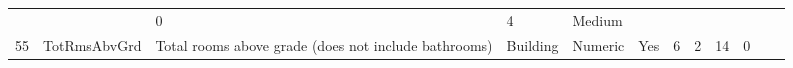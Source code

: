 \documentclass[11pt]{article}
\begin{document}
\begin{longtable}[]{@{}llllllllllll@{}}
\begin{minipage}[t]{0.04\columnwidth}
\strut
\end{minipage} & \begin{minipage}[t]{0.04\columnwidth}\raggedright\strut
\strut
\end{minipage} & \begin{minipage}[t]{0.04\columnwidth}\raggedright\strut
0\strut
\end{minipage} & \begin{minipage}[t]{0.04\columnwidth}\raggedright\strut
4\strut
\end{minipage} & \begin{minipage}[t]{0.04\columnwidth}\raggedright\strut
Medium\strut
\end{minipage}\tabularnewline
\begin{minipage}[t]{0.04\columnwidth}\raggedright\strut
55\strut
\end{minipage} & \begin{minipage}[t]{0.04\columnwidth}\raggedright\strut
TotRmsAbvGrd\strut
\end{minipage} & \begin{minipage}[t]{0.04\columnwidth}\raggedright\strut
Total rooms above grade (does not include bathrooms)\strut
\end{minipage} & \begin{minipage}[t]{0.04\columnwidth}\raggedright\strut
Building\strut
\end{minipage} & \begin{minipage}[t]{0.04\columnwidth}\raggedright\strut
Numeric\strut
\end{minipage} & \begin{minipage}[t]{0.04\columnwidth}\raggedright\strut
Yes\strut
\end{minipage} & \begin{minipage}[t]{0.04\columnwidth}\raggedright\strut
6\strut
\end{minipage} & \begin{minipage}[t]{0.04\columnwidth}\raggedright\strut
2\strut
\end{minipage} & \begin{minipage}[t]{0.04\columnwidth}\raggedright\strut
14\strut
\end{minipage} & \begin{minipage}[t]{0.04\columnwidth}\raggedright\strut
0\strut
\end{minipage} & \begin{minipage}[t]{0.04\columnwidth}\raggedright\strut
\strut
\end{minipage} & \begin{minipage}[t]{0.04\columnwidth}\raggedright\strut

\end{minipage}
\end{longtable}
\end{document}
